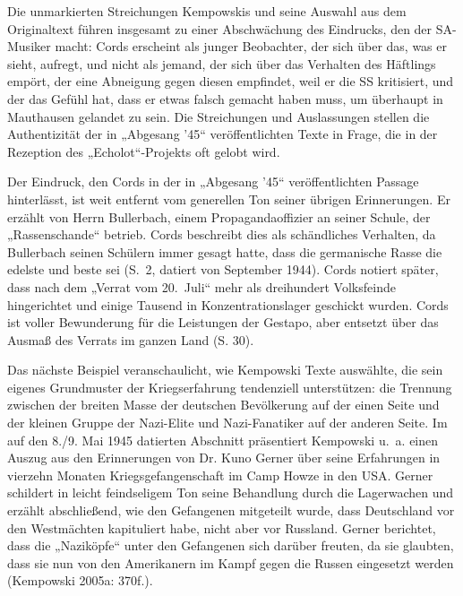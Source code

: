 \begin{multicols*}{2}
Die unmarkierten Streichungen Kempowskis und seine Auswahl aus dem Originaltext führen insgesamt zu einer Abschwächung des Eindrucks, den der SA-Musiker macht: Cords erscheint als junger Beobachter, der sich über das, was er sieht, aufregt, und nicht als jemand, der sich über das Verhalten des Häftlings empört, der eine Abneigung gegen diesen empfindet, weil er die SS kritisiert, und der das Gefühl hat, dass er etwas falsch gemacht haben muss, um überhaupt in Mauthausen gelandet zu sein. Die Streichungen und Auslassungen stellen die Authentizität der in „Abgesang ’45“ veröffentlichten Texte in Frage, die in der Rezeption des „Echolot“-Projekts oft gelobt wird.

Der Eindruck, den Cords in der in „Abgesang ’45“ veröffentlichten Passage hinterlässt, ist weit entfernt vom generellen Ton seiner übrigen Erinnerungen. Er erzählt von Herrn Bullerbach, einem Propagandaoffizier an seiner Schule, der „Rassenschande“ betrieb. Cords beschreibt dies als schändliches Verhalten, da Bullerbach seinen Schülern immer gesagt hatte, dass die germanische Rasse die edelste und beste sei (S. 2, datiert von September 1944). Cords notiert später, dass nach dem „Verrat vom 20. Juli“ mehr als dreihundert Volksfeinde hingerichtet und einige Tausend in Konzentrationslager geschickt wurden. Cords ist voller Bewunderung für die Leistungen der Gestapo, aber entsetzt über das Ausmaß des Verrats im ganzen Land (S. 30).

Das nächste Beispiel veranschaulicht, wie Kempowski Texte auswählte, die sein eigenes Grundmuster der Kriegserfahrung tendenziell unterstützen: die Trennung zwischen der breiten Masse der deutschen Bevölkerung auf der einen Seite und der kleinen Gruppe der Nazi-Elite und Nazi-Fanatiker auf der anderen Seite. Im auf den 8./9. Mai 1945 datierten Abschnitt präsentiert Kempowski u. a. einen Auszug aus den Erinnerungen von Dr. Kuno Gerner über seine Erfahrungen in vierzehn Monaten Kriegsgefangenschaft im Camp Howze in den USA. Gerner schildert in leicht feindseligem Ton seine Behandlung durch die Lagerwachen und erzählt abschließend, wie den Gefangenen mitgeteilt wurde, dass Deutschland vor den Westmächten kapituliert habe, nicht aber vor Russland. Gerner berichtet, dass die „Naziköpfe“ unter den Gefangenen sich darüber freuten, da sie glaubten, dass sie nun von den Amerikanern im Kampf gegen die Russen eingesetzt werden (Kempowski 2005a: 370f.).


\end{multicols*}
